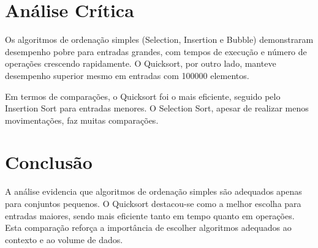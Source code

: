\documentclass[12pt]{article}
\begin{document}
\newpage

\section{Análise Crítica}

Os algoritmos de ordenação simples (Selection, Insertion e Bubble) demonstraram desempenho pobre para entradas grandes, com tempos de execução e número de operações crescendo rapidamente. O Quicksort, por outro lado, manteve desempenho superior mesmo em entradas com 100000 elementos.

Em termos de comparações, o Quicksort foi o mais eficiente, seguido pelo Insertion Sort para entradas menores. O Selection Sort, apesar de realizar menos movimentações, faz muitas comparações.

\section{Conclusão}

A análise evidencia que algoritmos de ordenação simples são adequados apenas para conjuntos pequenos. O Quicksort destacou-se como a melhor escolha para entradas maiores, sendo mais eficiente tanto em tempo quanto em operações. Esta comparação reforça a importância de escolher algoritmos adequados ao contexto e ao volume de dados.
\end{document}
